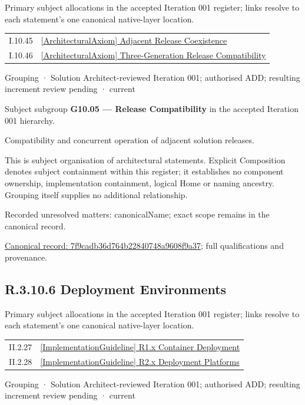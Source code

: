 Primary subject allocations in the accepted Iteration 001 register; links resolve to each statement’s one canonical native-layer location.\par
\begin{longtable}{p{.22\linewidth}p{.73\linewidth}}
I.10.45 & \hyperref[element:3ce5568f2ded498386fd6fcfb142f89a]{[ArchitecturalAxiom] Adjacent Release Coexistence} \\
I.10.46 & \hyperref[element:33d348c2936b401aa567d8fa531147ea]{[ArchitecturalAxiom] Three-Generation Release Compatibility} \\
\end{longtable}
\label{element:7f9cadb36d764b22840748a9608f9a37}
{\small Grouping · Solution Architect-reviewed Iteration 001; authorised ADD; resulting increment review pending · current}\par

Subject subgroup \textbf{G10.05 — Release Compatibility} in the accepted Iteration 001 hierarchy.



Compatibility and concurrent operation of adjacent solution releases.



This is subject organisation of architectural statements. Explicit Composition denotes subject containment within this register; it establishes no component ownership, implementation containment, logical Home or naming ancestry. Grouping itself supplies no additional relationship.


{\small Recorded unresolved matters: canonicalName; exact scope remains in the canonical record.}\par
{\footnotesize \href{../../../../continuum/grouping/7f9cadb36d764b22840748a9608f9a37.md}{Canonical record: 7f9cadb36d764b22840748a9608f9a37}; full qualifications and provenance.}\par
\subsection*{R.3.10.6 Deployment Environments}
\label{navigation:R.3.10.6}

Primary subject allocations in the accepted Iteration 001 register; links resolve to each statement’s one canonical native-layer location.\par
\begin{longtable}{p{.22\linewidth}p{.73\linewidth}}
II.2.27 & \hyperref[element:536bbcae0de5495a8f4d2e994cdc2232]{[ImplementationGuideline] R1.x Container Deployment} \\
II.2.28 & \hyperref[element:e1521c49b740487e935fa9ecd00675a0]{[ImplementationGuideline] R2.x Deployment Platforms} \\
\end{longtable}
\label{element:1b4044525d474363bafb462e575582b9}
{\small Grouping · Solution Architect-reviewed Iteration 001; authorised ADD; resulting increment review pending · current}\par

